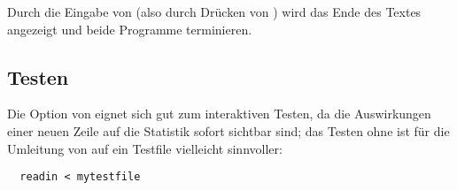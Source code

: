 Durch die Eingabe von  (also durch Drücken von
) wird das Ende des Textes angezeigt und beide Programme
terminieren.

\subsection*{Testen}

Die Option  von  eignet sich gut zum interaktiven
Testen, da die Auswirkungen einer neuen Zeile auf die Statistik sofort
sichtbar sind; das Testen ohne  ist für die Umleitung von
 auf ein Testfile vielleicht sinnvoller:
\begin{verbatim}
  readin < mytestfile
\end{verbatim}

\osueguidelinesthree


